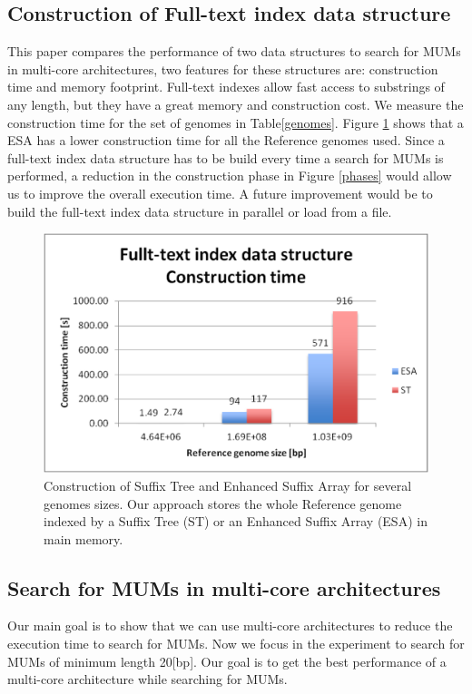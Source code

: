 \documentclass[runningheads,a4paper]{llncs}
\begin{document}
\subsection{Construction of Full-text index data structure}
This paper compares the performance of two data structures to search for MUMs in multi-core architectures, two features for these structures are: construction time and memory footprint. Full-text indexes allow fast access to substrings of any length, but they have a great memory and construction cost. %
We measure the construction time for the set of genomes in Table\ref{genomes}. Figure \ref{fig:construction} shows that a ESA has a lower construction time for all the Reference genomes used. Since a full-text index data structure has to be build every time a search for MUMs is performed, a reduction in the construction phase in Figure \ref{phases} would allow us to improve the overall execution time. A future improvement would be to build the full-text index data structure in parallel or load from a file.
 \begin{figure}[h]
  \centering
  \includegraphics[scale=0.3]{construction.eps}
  \caption{Construction of Suffix Tree and Enhanced Suffix Array for several genomes sizes. Our approach stores the whole Reference genome indexed by a Suffix Tree (ST) or an Enhanced Suffix Array (ESA) in main memory.}
  \label{fig:construction}
 \end{figure}  
 \subsection{Search for MUMs in multi-core architectures}
Our main goal is to show that we can use multi-core architectures to reduce the execution time to search for MUMs.
Now we focus in the experiment to search for MUMs of minimum length 20[bp]. Our goal is to get the best performance of a multi-core architecture while searching for MUMs.
\end{document}

